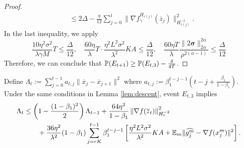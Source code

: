 \documentclass{article} %
\numberwithin{equation}{section}
\begin{document}
\begin{proof}
\begin{equation}
\begin{aligned}
            &\leq 2\Delta- \frac{\eta}{12} \sum_{j=0}^t\|\nabla f_\gamma^{H_{r(j)}}(\overline{z}_j)\|_{H_{r(j)}^{-1}}^2.
        \end{aligned}
    \end{equation}
    In the last inequality, we apply
    \begin{equation}
        \frac{10\eta^2\sigma^2}{\lambda\gamma M}T \leq \frac{\Delta}{12},\quad \frac{60\eta}{\lambda}T\cdot \frac{\eta^2L^2\sigma^2}{\lambda^2}KA \leq \frac{\Delta}{12},\quad 
        \frac{60\eta T}{\lambda} \frac{\|2\boldsymbol{\sigma}\|_{2\alpha}^{2\alpha}}{\rho^{2(\alpha-1)}} \leq \frac{\Delta}{12}
    \end{equation}
    Therefore, we can conclude that $\mathbb{P}(E_{t+1})\geq \mathbb{P}(E_{t,3})-\frac{\delta}{4T}$. 
\end{proof}

\begin{lemma}\label{lem:z-x}
    Define $\Lambda_t:=\sum_{j=0}^{t-1}a_{t,j}\|\overline{x}_j-\overline{x}_{j+1}\|^2$ where $a_{t,j}:=\beta_1^{t-j-1}(t-j+\frac{\beta_1}{1-\beta_1})$. Under the same conditions in Lemma \ref{lem:descent}, event $E_{t,3}$ implies 
    \begin{equation}
        \begin{aligned}
            \Lambda_t 
            &\leq \left(1-\frac{(1-\beta_1)^2}{2}\right)\Lambda_{t-1} + \frac{64\eta^2}{1-\beta_1}\left\|\nabla f(\overline{z}_t)\right\|_{H_r^{-2}}^2 \\
            &\qquad + \frac{36\eta^2}{\lambda^2}(1-\beta_1)\sum_{j=rK}^{t-1}\beta_1^{t-j-1} \left[\frac{\eta^2L^2\sigma^2}{\lambda^2}KA+\mathbb{E}_m\|\widehat{g_j^m}-\nabla f(x_j^m)\|^2\right].
        \end{aligned}
    \end{equation}
\end{lemma}
\end{document}
